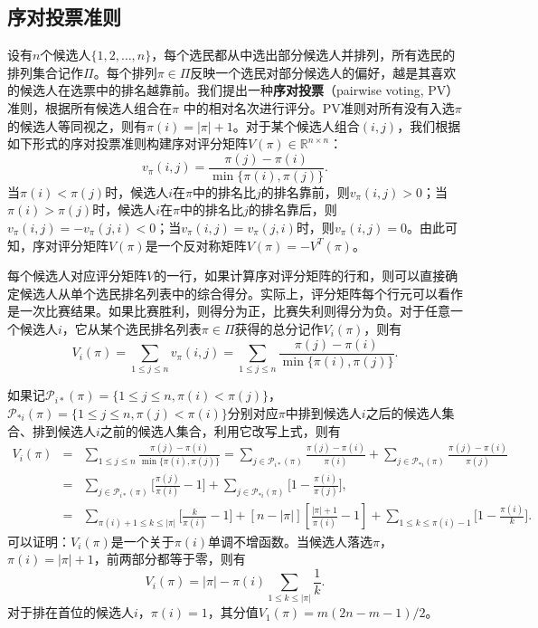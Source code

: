 \subsection{序对投票准则}
设有$n$个候选人$\{1,2,\ldots,n\}$，每个选民都从中选出部分候选人并排列，所有选民的排列集合记作$\Pi$。每个排列$\pi\in \Pi$反映一个选民对部分候选人的偏好，越是其喜欢的候选人在选票中的排名越靠前。我们提出一种\textbf{序对投票}（pairwise voting, PV）准则，根据所有候选人组合在$\pi$ 中的相对名次进行评分。PV准则对所有没有入选$\pi$的候选人等同视之，则有$\pi(i)=|\pi| + 1$。对于某个候选人组合$(i,j)$，我们根据如下形式的序对投票准则构建序对评分矩阵$V(\pi)\in \mathbb R^{n\times n}$：
\begin{equation}\label{eq:pvc}
    v_\pi(i,j) = \frac{\pi(j)-\pi(i)}{\min\{\pi(i),\pi(j)\}}.
\end{equation}
当$\pi(i) < \pi(j)$时，候选人$i$在$\pi$中的排名比$j$的排名靠前，则$v_\pi(i,j)>0$；当$\pi(i) > \pi(j)$时，候选人$i$在$\pi$中的排名比$j$的排名靠后，则$v_\pi(i,j)=-v_\pi(j,i) < 0$；当$v_\pi(i,j)=v_\pi(j,i)$时，则$v_\pi(i,j)=0$。由此可知，序对评分矩阵$V(\pi)$是一个反对称矩阵$V(\pi) = -V^T(\pi)$。

每个候选人对应评分矩阵$V$的一行，如果计算序对评分矩阵的行和，则可以直接确定候选人从单个选民排名列表中的综合得分。实际上，评分矩阵每个行元可以看作是一次比赛结果。如果比赛胜利，则得分为正，比赛失利则得分为负。对于任意一个候选人$i$，它从某个选民排名列表$\pi\in \Pi$获得的总分记作$V_i(\pi)$，则有
\begin{equation}
    V_i(\pi) = \sum\limits_{1\le j\le n} v_\pi(i,j) = \sum\limits_{1\le j\le n} \frac{\pi(j)-\pi(i)}{\min\{\pi(i),\pi(j)\}}.%
\end{equation}

如果记$\mathscr P_{i*}(\pi)=\{1\le j\le n, \pi(i) < \pi(j)\}$，$\mathscr P_{*i}(\pi)=\{1\le j\le n, \pi(j) < \pi(i)\}$分别对应$\pi$中排到候选人$i$之后的候选人集合、排到候选人$i$之前的候选人集合，利用它改写上式，则有
\begin{equation}
\begin{array}{lcl}
    V_i(\pi) &=& \sum\limits_{1\le j\le n} \frac{\pi(j)-\pi(i)}{\min\{\pi(i),\pi(j)\}} =  \sum\limits_{j\in \mathscr P_{i*}(\pi)} \frac{\pi(j)-\pi(i)}{\pi(i)} + \sum\limits_{j\in \mathscr P_{*i}(\pi)} \frac{\pi(j)-\pi(i)}{\pi(j)}\\
    &=& \sum\limits_{j\in \mathscr P_{i*}(\pi)} \big[\frac{\pi(j)}{\pi(i)} -1\big] + \sum\limits_{j\in \mathscr P_{*i}(\pi)} \big[1-\frac{\pi(i)}{\pi(j)}\big],\\
    &=& \sum\limits_{\pi(i)+1\le k \le |\pi|} \big[\frac{k}{\pi(i)} -1\big] + [n-|\pi|][\frac{|\pi|+1}{\pi(i)}-1] + \sum\limits_{1\le k \le \pi(i)-1} \big[1-\frac{\pi(i)}{k}\big].
\end{array}
\end{equation}
可以证明：$V_i(\pi)$是一个关于$\pi(i)$单调不增函数。当候选人落选$\pi$，$\pi(i)=|\pi|+1$，前两部分都等于零，则有
\begin{equation}
    V_i(\pi) = |\pi| - \pi(i)\sum\limits_{1\le k \le |\pi|} \frac{1}{k}.
\end{equation}
对于排在首位的候选人$i$，$\pi(i)=1$，其分值$V_1(\pi)=m(2n-m-1)/2$。

